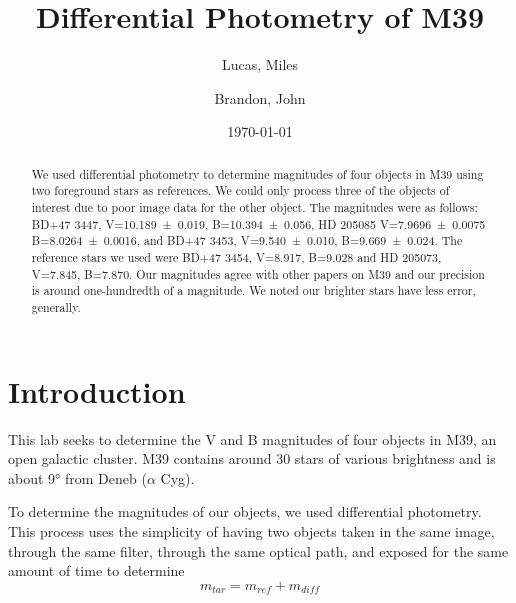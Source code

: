 \documentclass[%
aip,
jmp,
reprint,
floatfix
]{revtex4-1}
\begin{document}
	\title[Photometry of M39]{Differential Photometry of M39}

	\author{Lucas, Miles}
	\author{Brandon, John}

	\date{\today}



	\begin{abstract}
	We used differential photometry to determine magnitudes of four objects in M39 using two foreground stars as references. We could only process three of the objects of interest due to poor image data for the other object. The magnitudes were as follows: BD+47 3447, V=\SI{10.189\pm0.019}{}, B=\SI{10.394\pm0.056}{}, HD 205085  V=\SI{7.9696\pm0.0075}{} B=\SI{8.0264\pm0.0016}{}, and BD+47 3453, V=\SI{9.540\pm.010}{}, B=\SI{9.669\pm0.024}{}. The reference stars we used were BD+47 3454, V=\SI{8.917}{}, B=\SI{9.028}{} and HD 205073, V=\SI{7.845}{}, B=\SI{7.870}{}. Our magnitudes agree with other papers on M39 and our precision is around one-hundredth of a magnitude. We noted our brighter stars have less error, generally.

	\end{abstract}

	\maketitle


	\section{Introduction}

	This lab seeks to determine the V and B magnitudes of four objects in M39, an open galactic cluster. M39 contains around 30 stars of various brightness and is about \ang{9} from Deneb ($\alpha$ Cyg). 
	
	To determine the magnitudes of our objects, we used differential photometry. This process uses the simplicity of having two objects taken in the same image, through the same filter, through the same optical path, and exposed for the same amount of time to determine
	\begin{equation}
		m_{tar} = m_{ref} + m_{diff}
		\label{eqn:diff}
	\end{equation}
	
\end{document}
